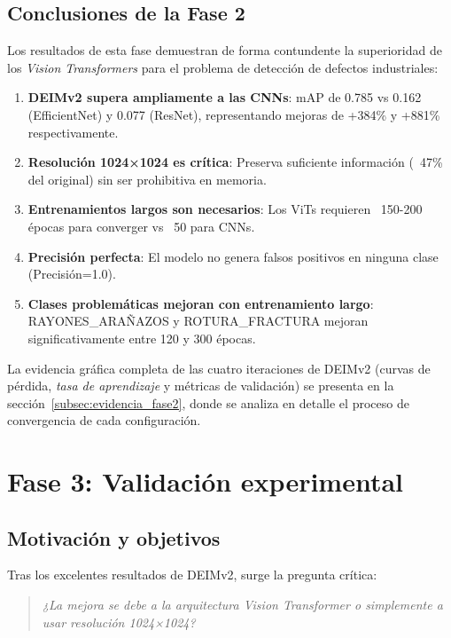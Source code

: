 \subsection{Conclusiones de la Fase 2}

Los resultados de esta fase demuestran de forma contundente la superioridad de los \textit{Vision Transformers} para el problema de detección de defectos industriales:

\begin{enumerate}
    \item \textbf{DEIMv2 supera ampliamente a las CNNs}: mAP de 0.785 vs 0.162 (EfficientNet) y 0.077 (ResNet), representando mejoras de +384\% y +881\% respectivamente.
    \item \textbf{Resolución 1024×1024 es crítica}: Preserva suficiente información (~47\% del original) sin ser prohibitiva en memoria.
    \item \textbf{Entrenamientos largos son necesarios}: Los ViTs requieren ~150-200 épocas para converger vs ~50 para CNNs.
    \item \textbf{Precisión perfecta}: El modelo no genera falsos positivos en ninguna clase (Precisión=1.0).
    \item \textbf{Clases problemáticas mejoran con entrenamiento largo}: \mbox{RAYONES\_ARAÑAZOS} y \mbox{ROTURA\_FRACTURA} mejoran significativamente entre 120 y 300 épocas.
\end{enumerate}

La evidencia gráfica completa de las cuatro iteraciones de DEIMv2 (curvas de pérdida, \textit{tasa de aprendizaje} y métricas de validación) se presenta en la sección~\ref{subsec:evidencia_fase2}, donde se analiza en detalle el proceso de convergencia de cada configuración.

\FloatBarrier
\section{Fase 3: Validación experimental}
\label{sec:fase3}

\subsection{Motivación y objetivos}

Tras los excelentes resultados de DEIMv2, surge la pregunta crítica: 
\begin{quote}
\textit{¿La mejora se debe a la arquitectura Vision Transformer o simplemente a usar resolución 1024×1024?}
\end{quote}

